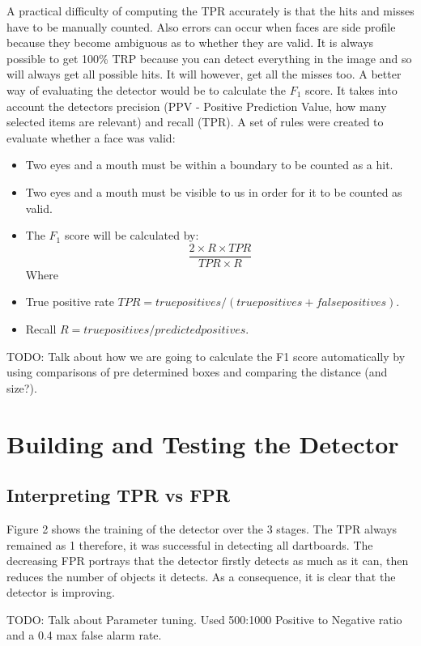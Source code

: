 \documentclass[a4paper]{article}
\begin{document}
A practical difficulty of computing the TPR accurately is that the hits and
misses have to be manually counted. Also errors can occur when faces are side
profile because they become ambiguous as to whether they are valid. It is
always possible to get 100\% TRP because you can detect everything in the image
and so will always get all possible hits. It will however, get all the misses
too. A better way of evaluating the detector would be to calculate the
\(F_{1}\) score. It takes into account the detectors precision (PPV - Positive
Prediction Value, how many selected items are relevant) and recall (TPR). A set
of rules were created to evaluate whether a face was valid:


\begin{itemize}
  \item Two eyes and a mouth must be within a boundary to be counted as a hit.
  \item Two eyes and a mouth must be visible to us in order for it to be
    counted as valid.
  \item The \(F_{1}\) score will be calculated by: \[\frac{2 \times R \times
    TPR}{TPR \times R}\] Where
  \item True positive rate ${TPR = true positives / (true positives + false
    positives)}$.
  \item Recall ${R = true positives / predicted positives}$.
\end{itemize}

TODO: Talk about how we are going to calculate the F1 score automatically by
using comparisons of pre determined boxes and comparing the distance (and
size?).

\section{Building and Testing the Detector}

\subsection*{Interpreting TPR vs FPR}

Figure 2 shows the training of the detector over the 3 stages. The TPR always
remained as 1 therefore, it was successful in detecting all dartboards. The
decreasing FPR portrays that the detector firstly detects as much as it can,
then reduces the number of objects it detects. As a consequence, it is clear
that the detector is improving.

TODO: Talk about Parameter tuning.  Used 500:1000 Positive to Negative ratio
and a 0.4 max false alarm rate.
\end{document}

